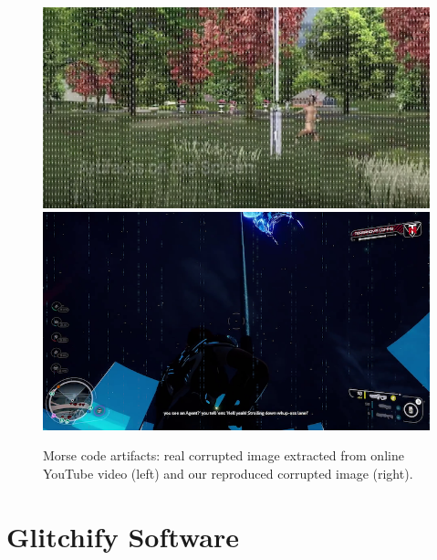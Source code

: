 \begin{figure}[!h]
\includegraphics[scale=0.765]{images/morse1.png}
\includegraphics[scale=0.288]{images/morse2.png}
\vspace{5pt}
\caption[Morse code artifacts]{Morse code artifacts: real corrupted image extracted from online YouTube video (left) and our reproduced corrupted image (right).}
\label{fig:morse}
\end{figure}


\section*{Glitchify Software}

